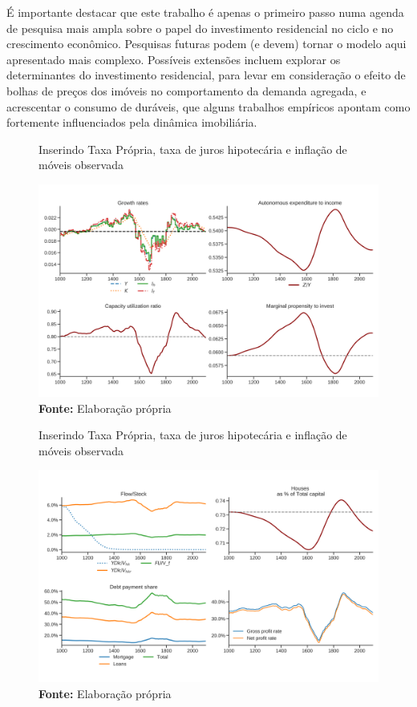 É importante destacar que este trabalho é apenas o primeiro passo numa agenda de pesquisa mais ampla sobre o papel do investimento residencial no ciclo e no crescimento econômico. Pesquisas futuras podem (e devem) tornar o modelo aqui apresentado mais complexo. Possíveis extensões incluem explorar os determinantes do investimento residencial, para levar em consideração o efeito de bolhas de preços dos imóveis no comportamento da demanda agregada, e acrescentar o consumo de duráveis, que alguns trabalhos empíricos apontam como fortemente influenciados pela dinâmica imobiliária. 

\begin{figure}[H]
	\centering
	\caption{Inserindo Taxa Própria, taxa de juros hipotecária e inflação de móveis observada}
	\label{choque_Real}
	\includegraphics[width=\textwidth]{../../Modelo/Versoes/Shock_Real.png}
	\caption*{\textbf{Fonte:} Elaboração própria}
\end{figure}


\begin{figure}[H]
	\centering
	\caption{Inserindo Taxa Própria, taxa de juros hipotecária e inflação de móveis observada}
	\label{choque_Real}
	\includegraphics[width=\textwidth]{../../Modelo/Versoes/Shock_RealNorms.png}
	\caption*{\textbf{Fonte:} Elaboração própria}
\end{figure}